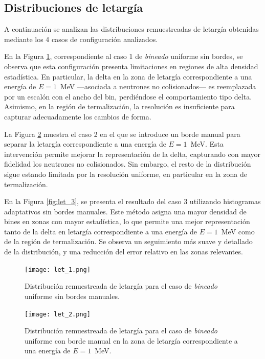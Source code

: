 \subsection{Distribuciones de letargía}
A continuación se analizan las distribuciones remuestreadas de letargía obtenidas mediante los 4 casos de configuración analizados.

En la Figura \ref{fig:let_1}, correspondiente al caso 1 de \textit{bineado} uniforme sin bordes, se observa que esta configuración presenta limitaciones en regiones de alta densidad estadística. En particular, la delta en la zona de letargía correspondiente a una energía de $E = 1$~MeV —asociada a neutrones no colisionados— es reemplazada por un escalón con el ancho del bin, perdiéndose el comportamiento tipo delta. Asimismo, en la región de termalización, la resolución es insuficiente para capturar adecuadamente los cambios de forma.

La Figura \ref{fig:let_2} muestra el caso 2 en el que se introduce un borde manual para separar la letargía correspondiente a una energía de $E = 1$~MeV. Esta intervención permite mejorar la representación de la delta, capturando con mayor fidelidad los neutrones no colisionados. Sin embargo, el resto de la distribución sigue estando limitada por la resolución uniforme, en particular en la zona de termalización.

En la Figura \ref{fig:let_3}, se presenta el resultado del caso 3 utilizando histogramas adaptativos sin bordes manuales. Este método asigna una mayor densidad de bines en zonas con mayor estadística, lo que permite una mejor representación tanto de la delta en letargía correspondiente a una energía de $E = 1$~MeV como de la región de termalización. Se observa un seguimiento más suave y detallado de la distribución, y una reducción del error relativo en las zonas relevantes.

\begin{figure}[H]
    \centering
    \texttt{[image: let\_1.png]}
    \caption{Distribución remuestreada de letargía para el caso de \textit{bineado} uniforme sin bordes manuales.}
    \label{fig:let_1}
\end{figure}

\begin{figure}[H]
    \centering
    \texttt{[image: let\_2.png]}
    \caption{Distribución remuestreada de letargía para el caso de \textit{bineado} uniforme con borde manual en la zona de letargía correspondiente a una energía de $E = 1$~MeV.}
    \label{fig:let_2}
\end{figure}

